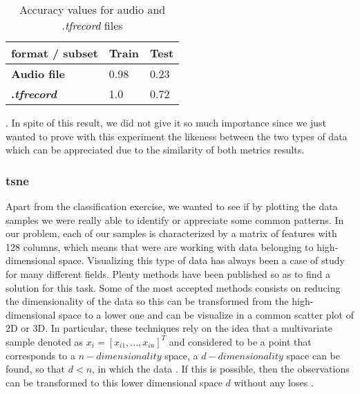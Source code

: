 	\begin{table}[h]
	\begin{center}
		\centering
		\begin{tabular}{|| m{7em} | m{7em} | m{7em} ||}
			\hline
			format / subset & \textbf{Train} & \textbf{Test} \\
			\hline\hline
			\textbf{Audio file} & 0.98 & 0.23 \\
			\hline
			\textbf{.\textit{tfrecord}} & 1.0 & 0.72 \\
			\hline
		\end{tabular}
	\end{center}
	\caption{Accuracy values for audio and .\textit{tfrecord} files}
	\label{table:5}
	\end{table}

	. In spite of this result, we did not give it so much importance since we just wanted to prove with this experiment the likeness between the two types of data which can be appreciated due to the similarity of both metrics results.
	
\subsubsection{\acrlong{tsne}}
	
	Apart from the classification exercise, we wanted to see if by plotting the data samples we were really able to identify or appreciate some common patterns. In our problem, each of our samples is characterized by a matrix of features with 128 columns, which means that were are working with data belonging to high-dimensional space. Visualizing this type of data has always been a case of study for many different fields. Plenty methods have been published so as to find a solution for this task. Some of the most accepted methods consists on reducing the dimensionality of the data so this can be transformed from the high-dimensional space to a lower one and can be visualize in a common scatter plot of 2D or 3D. In particular, these techniques rely on the idea that a multivariate sample denoted as $x_i = [x_{i1},..., x_{in}]^T$ and considered to be a point that corresponds to a $n-dimensionality$ space, a $d-dimensionality$ space can be found, so that $d < n$, in which the data . If this is possible, then the observations can be transformed to this lower dimensional space $d$ without any loses \cite{Kaski2011}. 
	
